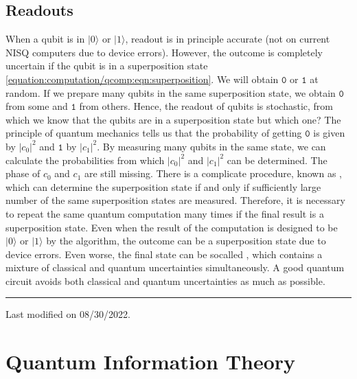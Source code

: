 \documentclass[letterpaper,10pt,english]{jupyterBook}
\begin{document}
\subsection{Readouts}
\label{\detokenize{computation/qcomp:readouts}}
\sphinxAtStartPar
When a qubit is in \(\lvert 0 \rangle\) or \(\lvert 1 \rangle\), readout is in principle accurate (not on current NISQ computers due to device errors). However, the outcome is completely uncertain if the qubit is in a superposition state \eqref{equation:computation/qcomp:eqn:superposition}. We will obtain \(\texttt{0}\) or \(\texttt{1}\) at random.  If we prepare many qubits in the same superposition state, we obtain \(\texttt{0}\) from some and \(\texttt{1}\) from others. Hence, the readout of qubits is stochastic, from which we know that the qubits are in a superposition state but which one?  The principle of quantum mechanics tells us that the probability of getting \(\texttt{0}\) is given by \(|c_0|^2\) and \(\texttt{1}\) by \(|c_1|^2\).  By measuring many qubits in the same state, we can calculate the probabilities from which \(|c_0|^2\) and \(|c_1|^2\) can be determined.  The phase of \(c_0\) and \(c_1\) are still missing.  There is a complicate procedure, known as , which can determine the superposition state if and only if sufficiently large number of the same superposition states are measured.  Therefore, it is necessary to repeat the same quantum computation many times if the final result is a superposition state.  Even when the result of the computation is designed to be \(\lvert 0 \rangle\) or \(\lvert 1 \rangle\) by the algorithm, the outcome can be a superposition state due to device errors.  Even worse, the final state can be so\sphinxhyphen{}called , which contains a mixture of classical and quantum uncertainties simultaneously.  A good quantum circuit avoids both classical and quantum uncertainties as much as possible.


\bigskip\hrule\bigskip


\sphinxAtStartPar
Last modified on 08/30/2022.

\sphinxstepscope


\section{Quantum Information Theory}
\label{\detokenize{computation/qinfo:quantum-information-theory}}\label{\detokenize{computation/qinfo:sec-qinfo}}\label{\detokenize{computation/qinfo::doc}}
\end{document}
